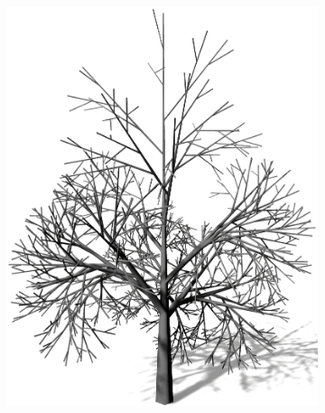 \begin{figure} [hbtp]
	\centering
	\begin{subfigure}[t]{.45\textwidth}
		\centering
		\includegraphics[height=.21\textheight]{images/LS_Monopodial_1.png}
		\caption{}
		\label{subfig:LS_Monopodial_1}
	\end{subfigure}
	\begin{subfigure}[t]{.45\textwidth}
		\centering

\end{subfigure}
\end{figure}
